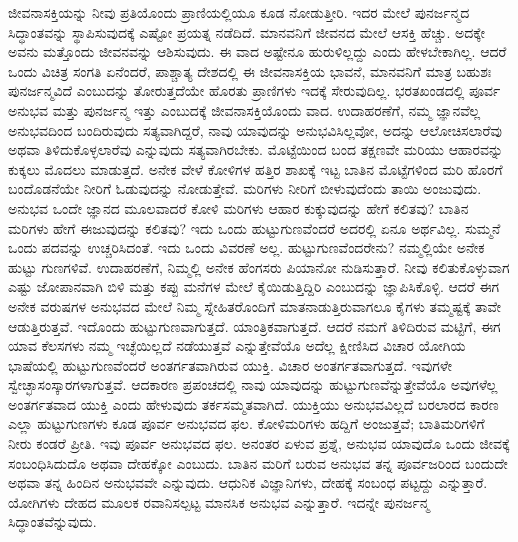 ಜೀವನಾಸಕ್ತಿಯನ್ನು ನೀವು ಪ್ರತಿಯೊಂದು ಪ್ರಾಣಿಯಲ್ಲಿಯೂ ಕೂಡ ನೋಡುತ್ತೀರಿ. ಇದರ ಮೇಲೆ ಪುನರ್ಜನ್ಮದ ಸಿದ್ಧಾಂತವನ್ನು ಸ್ಥಾಪಿಸುವುದಕ್ಕೆ ಎಷ್ಟೋ ಪ್ರಯತ್ನ ನಡೆದಿದೆ. ಮಾನವನಿಗೆ ಜೀವನದ ಮೇಲೆ ಆಸಕ್ತಿ ಹೆಚ್ಚು. ಅದಕ್ಕೇ ಅವನು ಮತ್ತೊಂದು ಜೀವನವನ್ನು ಆಶಿಸುವುದು. ಈ ವಾದ ಅಷ್ಟೇನೂ ಹುರುಳಿಲ್ಲದ್ದು ಎಂದು ಹೇಳಬೇಕಾಗಿಲ್ಲ. ಆದರೆ ಒಂದು ವಿಚಿತ್ರ ಸಂಗತಿ ಏನೆಂದರೆ, ಪಾಶ್ಚಾತ್ಯ ದೇಶದಲ್ಲಿ ಈ ಜೀವನಾಸಕ್ತಿಯ ಭಾವನೆ, ಮಾನವನಿಗೆ ಮಾತ್ರ ಬಹುಶಃ ಪುನರ್ಜನ್ಮವಿದೆ ಎಂಬುದನ್ನು ತೋರುತ್ತದೆಯೇ ಹೊರತು ಪ್ರಾಣಿಗಳು ಇದಕ್ಕೆ ಸೇರುವುದಿಲ್ಲ. ಭರತಖಂಡದಲ್ಲಿ ಪೂರ್ವ ಅನುಭವ ಮತ್ತು ಪುನರ್ಜನ್ಮ ಇತ್ತು ಎಂಬುದಕ್ಕೆ ಜೀವನಾಸಕ್ತಿಯೊಂದು ವಾದ. ಉದಾಹರಣೆಗೆ, ನಮ್ಮ ಜ್ಞಾನವೆಲ್ಲ ಅನುಭವದಿಂದ ಬಂದಿರುವುದು ಸತ್ಯವಾಗಿದ್ದರೆ, ನಾವು ಯಾವುದನ್ನು ಅನುಭವಿಸಿಲ್ಲವೋ, ಅದನ್ನು ಆಲೋಚಿಸಲಾರೆವು ಅಥವಾ ತಿಳಿದುಕೊಳ್ಳಲಾರೆವು ಎನ್ನುವುದು ಸತ್ಯವಾಗಿರಬೇಕು. ಮೊಟ್ಟೆಯಿಂದ ಬಂದ ತಕ್ಷಣವೇ ಮರಿಯು ಆಹಾರವನ್ನು ಕುಕ್ಕಲು ಮೊದಲು ಮಾಡುತ್ತದೆ. ಅನೇಕ ವೇಳೆ ಕೋಳಿಗಳ ಹತ್ತಿರ ಶಾಖಕ್ಕೆ ಇಟ್ಟ ಬಾತಿನ ಮೊಟ್ಟೆಗಳಿಂದ ಮರಿ ಹೊರಗೆ ಬಂದೊಡನೆಯೇ ನೀರಿಗೆ ಓಡುವುದನ್ನು ನೋಡುತ್ತೇವೆ. ಮರಿಗಳು ನೀರಿಗೆ ಬೀಳುವುದೆಂದು ತಾಯಿ ಅಂಜುವುದು. ಅನುಭವ ಒಂದೇ ಜ್ಞಾನದ ಮೂಲವಾದರೆ ಕೋಳಿ ಮರಿಗಳು ಆಹಾರ ಕುಕ್ಕುವುದನ್ನು ಹೇಗೆ ಕಲಿತವು? ಬಾತಿನ ಮರಿಗಳು ಹೇಗೆ ಈಜುವುದನ್ನು ಕಲಿತವು? ಇದು ಒಂದು ಹುಟ್ಟುಗುಣವೆಂದರೆ ಅದರಲ್ಲಿ ಏನೂ ಅರ್ಥವಿಲ್ಲ. ಸುಮ್ಮನೆ ಒಂದು ಪದವನ್ನು ಉಚ್ಚರಿಸಿದಂತೆ. ಇದು ಒಂದು ವಿವರಣೆ ಅಲ್ಲ. ಹುಟ್ಟುಗುಣವೆಂದರೇನು? ನಮ್ಮಲ್ಲಿಯೇ ಅನೇಕ ಹುಟ್ಟು ಗುಣಗಳಿವೆ. ಉದಾಹರಣೆಗೆ, ನಿಮ್ಮಲ್ಲಿ ಅನೇಕ ಹೆಂಗಸರು ಪಿಯಾನೋ ನುಡಿಸುತ್ತಾರೆ. ನೀವು ಕಲಿತುಕೊಳ್ಳುವಾಗ ಎಷ್ಟು ಜೋಪಾನವಾಗಿ ಬಿಳಿ ಮತ್ತು ಕಪ್ಪು ಮನೆಗಳ ಮೇಲೆ ಕೈಯಿಡುತ್ತಿದ್ದಿರಿ ಎಂಬುದನ್ನು ಜ್ಞಾಪಿಸಿಕೊಳ್ಳಿ. ಆದರೆ ಈಗ ಅನೇಕ ವರುಷಗಳ ಅನುಭವದ ಮೇಲೆ ನಿಮ್ಮ ಸ್ನೇಹಿತರೊಂದಿಗೆ ಮಾತನಾಡುತ್ತಿರುವಾಗಲೂ ಕೈಗಳು ತಮ್ಮಷ್ಟಕ್ಕೆ ತಾವೇ ಆಡುತ್ತಿರುತ್ತವೆ. ಇದೊಂದು ಹುಟ್ಟುಗುಣವಾಗುತ್ತದೆ. ಯಾಂತ್ರಿಕವಾಗುತ್ತದೆ. ಆದರೆ ನಮಗೆ ತಿಳಿದಿರುವ ಮಟ್ಟಿಗೆ, ಈಗ ಯಾವ ಕೆಲಸಗಳು ನಮ್ಮ ಇಚ್ಛೆಯಿಲ್ಲದೆ ನಡೆಯುತ್ತವೆ ಎನ್ನುತ್ತೇವೆಯೊ ಅದೆಲ್ಲ ಕ್ಷೀಣಿಸಿದ ವಿಚಾರ ಯೋಗಿಯ ಭಾಷೆಯಲ್ಲಿ ಹುಟ್ಟುಗುಣವೆಂದರೆ ಅಂತರ್ಗತವಾಗಿರುವ ಯುಕ್ತಿ. ವಿಚಾರ ಅಂತರ್ಗತವಾಗುತ್ತದೆ. ಇವುಗಳೇ ಸ್ವೇಚ್ಛಾಸಂಸ್ಕಾರಗಳಾಗುತ್ತವೆ. ಆದಕಾರಣ ಪ್ರಪಂಚದಲ್ಲಿ ನಾವು ಯಾವುದನ್ನು ಹುಟ್ಟುಗುಣವೆನ್ನುತ್ತೇವೆಯೊ ಅವುಗಳೆಲ್ಲ ಅಂತರ್ಗತವಾದ ಯುಕ್ತಿ ಎಂದು ಹೇಳುವುದು ತರ್ಕಸಮ್ಮತವಾಗಿದೆ. ಯುಕ್ತಿಯು ಅನುಭವವಿಲ್ಲದೆ ಬರಲಾರದ ಕಾರಣ ಎಲ್ಲಾ ಹುಟ್ಟುಗುಣಗಳು ಕೂಡ ಪೂರ್ವ ಅನುಭವದ ಫಲ. ಕೋಳಿಮರಿಗಳು ಹದ್ದಿಗೆ ಅಂಜುತ್ತವೆ; ಬಾತಿಮರಿಗಳಿಗೆ ನೀರು ಕಂಡರೆ ಪ್ರೀತಿ. ಇವು ಪೂರ್ವ ಅನುಭವದ ಫಲ. ಅನಂತರ ಏಳುವ ಪ್ರಶ್ನೆ, ಅನುಭವ ಯಾವುದೊ ಒಂದು ಜೀವಕ್ಕೆ ಸಂಬಂಧಿಸಿದುದೊ ಅಥವಾ ದೇಹಕ್ಕೋ ಎಂಬುದು. ಬಾತಿನ ಮರಿಗೆ ಬರುವ ಅನುಭವ ತನ್ನ ಪೂರ್ವಜರಿಂದ ಬಂದುದೇ ಅಥವಾ ತನ್ನ ಹಿಂದಿನ ಅನುಭವವೇ ಎನ್ನುವುದು. ಆಧುನಿಕ ವಿಜ್ಞಾನಿಗಳು, ದೇಹಕ್ಕೆ ಸಂಬಂಧ ಪಟ್ಟದ್ದು ಎನ್ನುತ್ತಾರೆ. ಯೋಗಿಗಳು ದೇಹದ ಮೂಲಕ ರವಾನಿಸಲ್ಪಟ್ಟ ಮಾನಸಿಕ ಅನುಭವ ಎನ್ನುತ್ತಾರೆ. ಇದನ್ನೇ ಪುನರ್ಜನ್ಮ ಸಿದ್ಧಾಂತವೆನ್ನುವುದು. 

